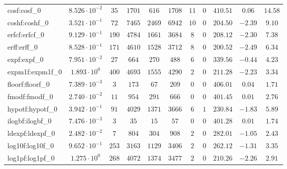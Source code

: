\begin{tabular}{|l|c|c|c|c|c|c|c|c|c|c|}
cosf:cosf\_0                 & $ 8.526 \cdot 10^{-2} $ & $ 35     $ & $ 1701   $ & $ 616   $ & $ 1708   $ & $ 11  $ & $ 0 $ & $ 410.51      $ & $ 0.06    $ & $ 14.58   $ \\
coshf:coshf\_0               & $ 3.521 \cdot 10^{-1} $ & $ 72     $ & $ 7465   $ & $ 2469  $ & $ 6942   $ & $ 10  $ & $ 0 $ & $ 204.50      $ & $ -2.39   $ & $ 9.10    $ \\
erfcf:erfcf\_0               & $ 9.129 \cdot 10^{-1} $ & $ 190    $ & $ 4784   $ & $ 1661  $ & $ 3684   $ & $ 8   $ & $ 0 $ & $ 208.12      $ & $ -2.30   $ & $ 7.38    $ \\
erff:erff\_0                 & $ 8.528 \cdot 10^{-1} $ & $ 171    $ & $ 4610   $ & $ 1528  $ & $ 3712   $ & $ 8   $ & $ 0 $ & $ 200.52      $ & $ -2.49   $ & $ 6.34    $ \\
expf:expf\_0                 & $ 7.951 \cdot 10^{-2} $ & $ 27     $ & $ 664    $ & $ 270   $ & $ 488    $ & $ 6   $ & $ 0 $ & $ 339.56      $ & $ -0.44   $ & $ 4.23    $ \\
expm1f:expm1f\_0             & $ 1.893 \cdot 10^{0}  $ & $ 400    $ & $ 4693   $ & $ 1555  $ & $ 4290   $ & $ 2   $ & $ 0 $ & $ 211.28      $ & $ -2.23   $ & $ 3.34    $ \\
floorf:floorf\_0             & $ 7.389 \cdot 10^{-3} $ & $ 3      $ & $ 173    $ & $ 67    $ & $ 209    $ & $ 0   $ & $ 0 $ & $ 406.01      $ & $ 0.04    $ & $ 1.71    $ \\
fmodf:fmodf\_0               & $ 2.740 \cdot 10^{-2} $ & $ 11     $ & $ 954    $ & $ 291   $ & $ 666    $ & $ 0   $ & $ 0 $ & $ 401.45      $ & $ 0.01    $ & $ 2.76    $ \\
hypotf:hypotf\_0             & $ 3.942 \cdot 10^{-1} $ & $ 91     $ & $ 4029   $ & $ 1371  $ & $ 3666   $ & $ 6   $ & $ 1 $ & $ 230.84      $ & $ -1.83   $ & $ 5.89    $ \\
ilogbf:ilogbf\_0             & $ 7.476 \cdot 10^{-3} $ & $ 3      $ & $ 35     $ & $ 15    $ & $ 57     $ & $ 0   $ & $ 0 $ & $ 401.28      $ & $ 0.01    $ & $ 1.74    $ \\
ldexpf:ldexpf\_0             & $ 2.482 \cdot 10^{-2} $ & $ 7      $ & $ 804    $ & $ 304   $ & $ 908    $ & $ 2   $ & $ 0 $ & $ 282.01      $ & $ -1.05   $ & $ 2.43    $ \\
log10f:log10f\_0             & $ 9.652 \cdot 10^{-1} $ & $ 253    $ & $ 3163   $ & $ 1129  $ & $ 3406   $ & $ 2   $ & $ 0 $ & $ 262.12      $ & $ -1.31   $ & $ 3.35    $ \\
log1pf:log1pf\_0             & $ 1.275 \cdot 10^{0}  $ & $ 268    $ & $ 4072   $ & $ 1374  $ & $ 3477   $ & $ 2   $ & $ 0 $ & $ 210.26      $ & $ -2.26   $ & $ 2.91    $ \\

\end{tabular}

